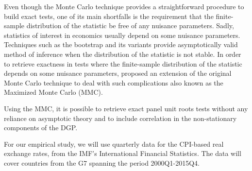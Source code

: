 \documentclass[12pt]{article}\usepackage[]{graphicx}\usepackage[]{color}
\begin{document}
Even though the Monte Carlo technique provides a straightforward procedure to build exact tests, one of its main shortfalls is the requirement that the finite-sample distribution of the statistic be free of any nuisance parameters. Sadly, statistics of interest in economics usually depend on some nuisance parameters. Techniques such as the bootstrap and its variants provide asymptotically valid method of inference when the distribution of the statistic is not stable. In order to retrieve exactness in tests where the finite-sample distribution of the statistic depends on some nuisance parameters, \cite{dufour_monte_2006} proposed an extension of the original Monte Carlo technique to deal with such complications also known as the Maximized Monte Carlo (MMC).

Using the MMC, it is possible to retrieve exact panel unit roots tests without any reliance on asymptotic theory and to include correlation in the non-stationary components of the DGP.

For our empirical study, we will use quarterly data for the CPI-based real exchange rates, from the IMF's International Financial Statistics. The data will cover countries from the G7 spanning the period 2000Q1-2015Q4.


%
%
%
%
%
%
%
%
%
%



\clearpage
\singlespacing


\end{document}
